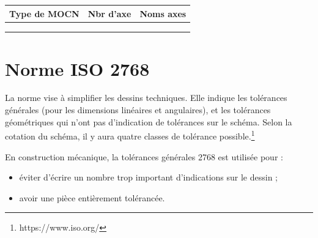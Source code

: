 \documentclass[
	11pt, %
	fleqn, %
	a4paper, %
]{LegrandOrangeBook}
\begin{document}
\begin{table}[H] %
	\centering %
	\begin{tabular}{L{0.15\textwidth} R{0.15\textwidth} R{0.15\textwidth}} %
		\toprule
		\textbf{Type de MOCN} & \textbf{Nbr d'axe} & \textbf{Noms axes}\\
		\midrule
		  &  &  \\
		  &  &  \\
		  &  &  \\
		\bottomrule
	\end{tabular}
	\label{tab:example} %
\end{table}




\section{Norme ISO 2768}
\begin{definition}
    La norme vise à simplifier les dessins techniques. Elle indique les tolérances générales (pour les dimensions linéaires et angulaires), et les tolérances géométriques qui n'ont pas d'indication de tolérances sur le schéma. Selon la cotation du schéma, il y aura quatre classes de tolérance possible.\footnote{https://www.iso.org/} \\
\end{definition}


En	construction	mécanique,	la	tolérances	générales 2768	est	utilisée pour	:\\
\begin{itemize}
    \item éviter d'écrire un nombre trop important	d'indications sur le dessin ;
    \item avoir	une	pièce entièrement tolérancée.\\
\end{itemize}
\end{document}
